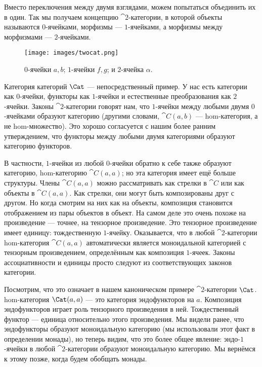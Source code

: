 Вместо переключения между двумя взглядами, можем попытаться объединить их в
один. Так мы получаем концепцию $\cat{2}$-категории, в которой объекты
называются $0$-ячейками, морфизмы — $1$-ячейками, а морфизмы между
морфизмами — $2$-ячейками.

\begin{figure}[H]
  \centering
  \texttt{[image: images/twocat.png]}
  \caption{$0$-ячейки $a, b$; $1$-ячейки $f, g$; и $2$-ячейка $\alpha$.}
\end{figure}

\noindent
Категория категорий $\Cat$ — непосредственный пример. У нас есть
категории как $0$-ячейки, функторы как $1$-ячейки и естественные преобразования
как $2$-ячейки. Законы $\cat{2}$-категории говорят нам, что $1$-ячейки между любыми
двумя $0$-ячейками образуют категорию (другими словами, $\cat{C}(a, b)$ —
hom-категория, а не hom-множество). Это хорошо согласуется с нашим более ранним
утверждением, что функторы между любыми двумя категориями образуют категорию функторов.

В частности, $1$-ячейки из любой $0$-ячейки обратно к себе также образуют
категорию, hom-категорию $\cat{C}(a, a)$; но эта категория имеет ещё
больше структуры. Члены $\cat{C}(a, a)$ можно рассматривать как стрелки в
$\cat{C}$ или как объекты в $\cat{C}(a, a)$. Как стрелки, они могут быть
композированы друг с другом. Но когда смотрим на них как на объекты,
композиция становится отображением из пары объектов в объект. На
самом деле это очень похоже на произведение --- точнее, на тензорное произведение. Это тензорное произведение имеет единицу: тождественную $1$-ячейку. Оказывается,
что в любой $\cat{2}$-категории hom-категория $\cat{C}(a, a)$
автоматически является моноидальной категорией с тензорным произведением, определённым как
композиция $1$-ячеек. Законы ассоциативности и единицы просто следуют из
соответствующих законов категории.

Посмотрим, что это означает в нашем каноническом примере $\cat{2}$-категории
$\Cat$. hom-категория $\Cat(a, a)$ — это категория
эндофункторов на $a$. Композиция эндофункторов играет роль
тензорного произведения в ней. Тождественный функтор — единица относительно
этого произведения. Мы видели ранее, что эндофункторы образуют моноидальную
категорию (мы использовали этот факт в определении монады), но теперь
видим, что это более общее явление: эндо-$1$-ячейки в любой
$\cat{2}$-категории образуют моноидальную категорию. Мы вернёмся к этому позже, когда будем
обобщать монады.


